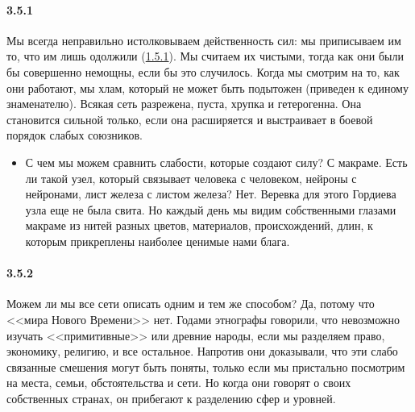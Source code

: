 \paragraph{3.5.1}\hypertarget{par:3.5.1}{} Мы всегда неправильно истолковываем действенность сил: мы приписываем им то, что им лишь одолжили (\hyperlink{par:1.5.1}{1.5.1}). Мы считаем их чистыми, тогда как они были бы совершенно немощны, если бы это случилось. Когда мы смотрим на то, как они работают, мы хлам, который не может быть подытожен (приведен к единому знаменателю). Всякая сеть разрежена, пуста, хрупка и гетерогенна. Она становится сильной только, если она расширяется и выстраивает в боевой порядок слабых союзников. 
	\begin{itemize}
	\item 
	С чем мы можем сравнить слабости, которые создают силу? С макраме. Есть ли такой узел, который связывает человека с человеком, нейроны с нейронами, лист железа с листом железа? Нет. Веревка для этого Гордиева узла еще не была свита. Но каждый день мы видим собственными глазами макраме из нитей разных цветов, материалов, происхождений, длин, к которым прикреплены наиболее ценимые нами блага.
	\end{itemize}

\paragraph{3.5.2}\hypertarget{par:3.5.2}{} Можем ли мы все сети описать одним и тем же способом? Да, потому что <<мира Нового Времени>> нет.
Годами этнографы говорили, что невозможно изучать <<примитивные>> или древние народы, если мы разделяем право, экономику, религию, и все остальное. Напротив они доказывали, что эти слабо связанные смешения могут быть поняты, только если мы пристально посмотрим на места, семьи, обстоятельства и сети. Но когда они говорят о своих собственных странах, он прибегают к разделению сфер и уровней.
 

